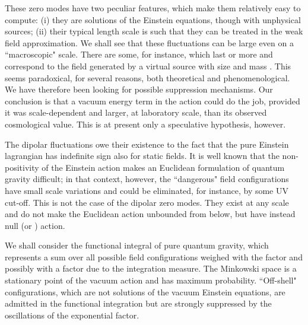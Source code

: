 \documentclass[a4paper,11pt]{article}
\begin{document}
These zero modes have two peculiar features, which make
them relatively easy to compute: (i) they are solutions of the
Einstein equations, though with unphysical sources;
(ii) their typical length scale is such that they can
be treated in the weak field approximation. We shall see
that these fluctuations can be large even on a
``macroscopic" scale. There are some, for instance, which
last \coordHE{} or more and correspond to the field
generated by a virtual source with size \coordHE{}
and mass \coordHE{}. This seems paradoxical, for
several reasons, both theoretical and phenomenological.
We have
therefore been looking for possible suppression
mechanisms. Our conclusion is that a vacuum energy term
\coordHE{} in the action
could do the job, provided it was scale-dependent and
larger, at laboratory scale, than its observed
cosmological value. This is at present only a speculative
hypothesis, however.

The dipolar fluctuations owe their existence to the fact
that the pure Einstein lagrangian \coordHE{} has indefinite sign also for static
fields. It is well known that the non-positivity of
the Einstein action makes an Euclidean formulation of
quantum gravity difficult; in that context, however,
the ``dangerous" field configurations have small
scale variations and could be eliminated, for instance,
by some UV cut-off. This is not the case of the dipolar
zero modes. They exist at any scale and do not make the
Euclidean action unbounded from below, but have instead
null (or \myHighlight{$\ll \hbar$}\coordHE{}) action.

We shall consider the functional integral of pure quantum 
gravity, which represents a sum over all possible field 
configurations weighed with the factor \coordHE{} and possibly with a factor due to the 
integration measure. The Minkowski space is a stationary 
point of the vacuum action and has maximum probability.
``Off-shell" configurations, which are not solutions of 
the vacuum Einstein equations, are admitted in the 
functional integration but are strongly suppressed by 
the oscillations of the exponential factor.
\end{document}
